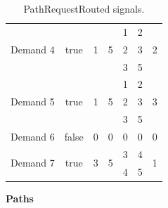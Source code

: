 \begin{table}[H]
\begin{tabular}{c|c|c|c|c|c|c|}
		\multicolumn{1}{|c|}{\multirow{3}{*}{Demand 4}} & \multirow{3}{*}{true}   & \multirow{3}{*}{1} & \multirow{3}{*}{5} & 1              & 2                   & \multirow{3}{*}{2}          \\ \cline{5-6}
		\multicolumn{1}{|c|}{}                          &                         &                    &                    & 2              & 3                   &                             \\ \cline{5-6}
		\multicolumn{1}{|c|}{}                          &                         &                    &                    & 3              & 5                   &                             \\ \hline
		\multicolumn{1}{|c|}{\multirow{3}{*}{Demand 5}} & \multirow{3}{*}{true}   & \multirow{3}{*}{1} & \multirow{3}{*}{5} & 1              & 2                   & \multirow{3}{*}{3}          \\ \cline{5-6}
		\multicolumn{1}{|c|}{}                          &                         &                    &                    & 2              & 3                   &                             \\ \cline{5-6}
		\multicolumn{1}{|c|}{}                          &                         &                    &                    & 3              & 5                   &                             \\ \hline
		\multicolumn{1}{|c|}{Demand 6}                  & false                   & 0                  & 0                  & 0              & 0                   & 0                           \\ \hline
		\multicolumn{1}{|c|}{\multirow{2}{*}{Demand 7}} & \multirow{2}{*}{true}   & \multirow{2}{*}{3} & \multirow{2}{*}{5} & 3              & 4                   & \multirow{2}{*}{1}          \\ \cline{5-6}
		\multicolumn{1}{|c|}{}                          &                         &                    &                    & 4              & 5                   &                             \\ \hline
	\end{tabular}
	\caption{PathRequestRouted signals.}
	\label{pathRequestRouted_example}
\end{table}
\clearpage
\textbf{Paths}

